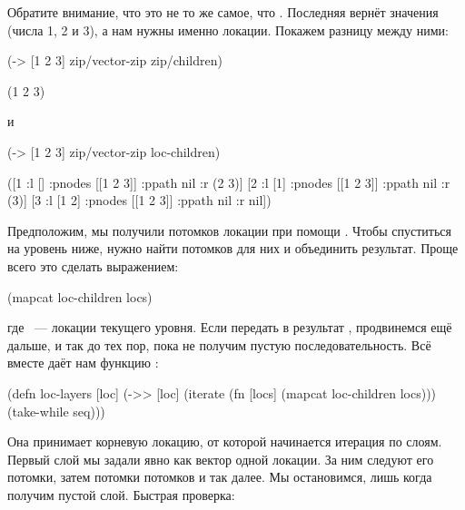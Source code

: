 Обратите внимание, что это не то же самое, что . Последняя
вернёт значения (числа 1, 2 и 3), а нам нужны именно локации. Покажем разницу
между ними:

\begin{english}
  \begin{clojure}
(-> [1 2 3]
    zip/vector-zip
    zip/children)

(1 2 3)
  \end{clojure}
\end{english}

\noindent
и

\begin{english}
  \begin{clojure}
(-> [1 2 3]
    zip/vector-zip
    loc-children)

([1 {:l [] :pnodes [[1 2 3]] :ppath nil :r (2 3)}]
 [2 {:l [1] :pnodes [[1 2 3]] :ppath nil :r (3)}]
 [3 {:l [1 2] :pnodes [[1 2 3]] :ppath nil :r nil}])
  \end{clojure}
\end{english}

Предположим, мы получили потомков локации при помощи .  Чтобы
спуститься на уровень ниже, нужно найти потомков для них и объединить
результат. Проще всего это сделать выражением:

\begin{english}
  \begin{clojure}
(mapcat loc-children locs)
  \end{clojure}
\end{english}

\noindent
где ~--- локации текущего уровня. Если передать в  результат
, продвинемся ещё дальше, и так до тех пор, пока не получим пустую
последовательность. Всё вместе даёт нам функцию :

\begin{english}
  \begin{clojure}
(defn loc-layers [loc]
  (->> [loc]
       (iterate (fn [locs]
                  (mapcat loc-children locs)))
       (take-while seq)))
  \end{clojure}
\end{english}

Она принимает корневую локацию, от которой начинается итерация по слоям. Первый
слой мы задали явно как вектор одной локации. За ним следуют его потомки, затем
потомки потомков и так далее. Мы остановимся, лишь когда получим пустой
слой. Быстрая проверка:

